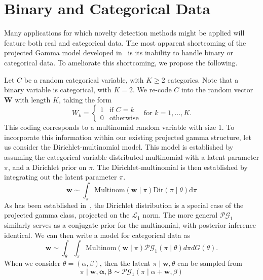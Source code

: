 
\section{Binary and Categorical Data}

Many applications for which novelty detection methods might be applied will feature both real and categorical data.  
The most apparent shortcoming of the projected Gamma model developed in~\cite{trubey:pg} is
its inability to handle binary or categorical data.  To ameliorate this shortcoming, we propose
the following.

Let $C$ be a random categorical variable, with $K \geq 2$ categories.  Note that a binary variable is categorical, with $K = 2$. We re-code $C$ into the random vector $\bm{W}$ with length $K$, taking the form
\[
    W_k = \begin{cases}
    1 &\text{if }C = k\\
    0 &\text{otherwise}
    \end{cases} \text{ for }k = 1,\ldots, K.
\]
This coding corresponds to a multinomial random variable with size 1. To incorporate this information within our existing projected gamma structure, let us consider the Dirichlet-multinomial model.  This model is established by assuming the categorical variable distributed multinomial with a latent parameter $\pi$, and a Dirichlet prior on $\pi$. The Dirichlet-multinomial is then established by integrating out the latent parameter $\pi$. 
\[
    \bm{w} \sim \int_{\pi} \text{Multinom}(\bm{w}\mid\pi)\text{Dir}(\pi\mid\theta)\text{d}\pi
\]
As has been established in~\cite{trubey:pg}, the Dirichlet distribution is a special case of the projected gamma class, projected on the $\mathcal{L}_1$ norm.  The more general $\mathcal{PG}_1$ similarly serves as a conjugate prior for the multinomial, with posterior inference identical.  We can then write a model for categorical data as
\begin{equation}
    \label{model:cat}
    \bm{w} \sim \int_{\theta}\int_{\pi}\text{Multinom}(\bm{w}\mid \pi)\mathcal{PG}_1(\pi\mid \theta)d\pi dG(\theta).
\end{equation}
When we consider $\theta = (\alpha,\beta)$, then the latent $\pi\mid \bm{w},\theta$ can be sampled from
\begin{equation}
    \label{eqn:pifc}
    \pi\mid \bm{w},\bm{\alpha},\bm{\beta} \sim \mathcal{PG}_1(\pi\mid\alpha + \bm{w}, \beta)
\end{equation}


